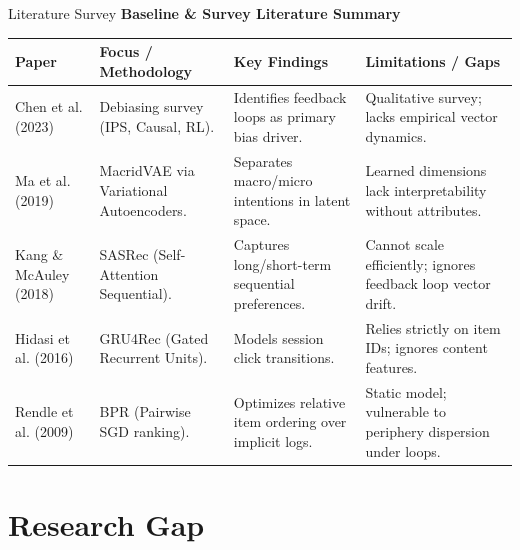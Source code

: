 \documentclass[11pt,aspectratio=43,xcolor=table]{beamer}
\providecommand{\strong}[1]{\textbf{#1}}
\begin{document}
\begin{frame}{Literature Survey}
\small
\textbf{Baseline \& Survey Literature Summary}

\vspace{0.1cm}
\scriptsize
\setlength{\tabcolsep}{1.5pt}
\renewcommand{\arraystretch}{1.1}
\begin{tabularx}{\textwidth}{L{2.0cm} Z Z Z}
\toprule
\strong{Paper} & \strong{Focus / Methodology} & \strong{Key Findings} & \strong{Limitations / Gaps} \\
\midrule
Chen et al. (2023) & Debiasing survey (IPS, Causal, RL). & Identifies feedback loops as primary bias driver. & Qualitative survey; lacks empirical vector dynamics. \\
\midrule
Ma et al. (2019) & MacridVAE via Variational Autoencoders. & Separates macro/micro intentions in latent space. & Learned dimensions lack interpretability without attributes. \\
\midrule
Kang \& McAuley (2018) & SASRec (Self-Attention Sequential). & Captures long/short-term sequential preferences. & Cannot scale efficiently; ignores feedback loop vector drift. \\
\midrule
Hidasi et al. (2016) & GRU4Rec (Gated Recurrent Units). & Models session click transitions. & Relies strictly on item IDs; ignores content features. \\
\midrule
Rendle et al. (2009) & BPR (Pairwise SGD ranking). & Optimizes relative item ordering over implicit logs. & Static model; vulnerable to periphery dispersion under loops. \\
\bottomrule
\end{tabularx}
\end{frame}

\section{Research Gap}
\end{document}
